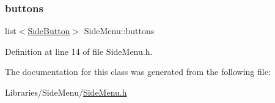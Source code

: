\subsubsection{\texorpdfstring{buttons}{buttons}}
{\footnotesize\ttfamily list$<$\mbox{\hyperlink{struct_side_button}{Side\+Button}}$>$ Side\+Menu\+::buttons\hspace{0.3cm}{\ttfamily [private]}}



Definition at line 14 of file Side\+Menu.\+h.



The documentation for this class was generated from the following file\+:\begin{DoxyCompactItemize}
\item 
Libraries/\+Side\+Menu/\mbox{\hyperlink{_side_menu_8h}{Side\+Menu.\+h}}\end{DoxyCompactItemize}
